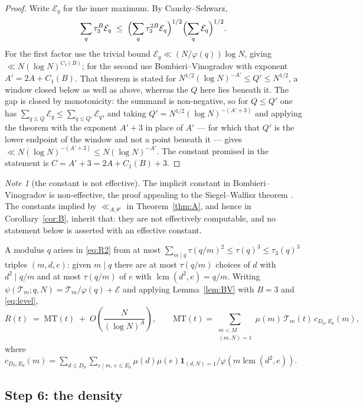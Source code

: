 \documentclass[11pt,a4paper]{article}
\theoremstyle{plain}
\theoremstyle{definition}
\theoremstyle{remark}
\newtheorem{note}[theorem]{Note}
\newcommand{\Tcut}{\mathcal T}
\DeclareMathOperator{\lcm}{lcm}
\begin{document}
\begin{proof}
Write $\mathcal E_q$ for the inner maximum. By Cauchy--Schwarz,
\[
  \sum_q\tau_3^B\mathcal E_q
  \;\le\;\Bigl(\sum_q\tau_3^{2B}\mathcal E_q\Bigr)^{1/2}
         \Bigl(\sum_q\mathcal E_q\Bigr)^{1/2}.
\]
For the first factor use the trivial bound
$\mathcal E_q\ll(N/\varphi(q))\log N$, giving $\ll N(\log N)^{C_1(B)}$;
for the second use Bombieri--Vinogradov \cite{MoV2} with exponent
$A'=2A+C_1(B)$. That theorem is stated for
$N^{1/2}(\log N)^{-A'}\le Q'\le N^{1/2}$, a window closed below as well
as above, whereas the $Q$ here lies beneath it. The gap is closed by
monotonicity: the summand is non-negative, so for $Q\le Q'$ one has
$\sum_{q\le Q}\mathcal E_q\le\sum_{q\le Q'}\mathcal E_q$, and taking
$Q'=N^{1/2}(\log N)^{-(A'+3)}$ and applying the theorem with the
exponent $A'+3$ in place of $A'$ --- for which that $Q'$ is the lower
endpoint of the window and not a point beneath it --- gives
$\ll N(\log N)^{-(A'+3)}\le N(\log N)^{-A'}$. The constant promised
in the statement is $C=A'+3=2A+C_1(B)+3$.
\end{proof}

\begin{note}[the constant is not effective]\label{note:noneffective}
The implicit constant in Bombieri--Vinogradov is non-effective, the
proof appealing to the Siegel--Walfisz theorem \cite{MoV2}. The
constants implied by $\ll_{A,\theta'}$ in Theorem~\ref{thm:A}, and
hence in Corollary~\ref{cor:B}, inherit that: they are not effectively
computable, and no statement below is asserted with an effective
constant.
\end{note}

A modulus $q$ arises in \eqref{eq:R2} from at most
$\sum_{m\mid q}\tau(q/m)^2\le\tau(q)^3\le\tau_3(q)^3$ triples
$(m,d,e)$: given $m\mid q$ there are at most $\tau(q/m)$ choices of
$d$ with $d^2\mid q/m$ and at most $\tau(q/m)$ of $e$ with
$\lcm(d^2,e)=q/m$. Writing $\psi(\Tcut_m;q,N)=\Tcut_m/\varphi(q)+\mathcal E$
and applying Lemma~\ref{lem:BV} with $B=3$ and \eqref{eq:level},
\begin{equation}\label{eq:R3}
  R(t)\;=\;\mathrm{MT}(t)\;+\;O\!\left(\frac{N}{(\log N)^{A}}\right),
  \qquad
  \mathrm{MT}(t)=\sum_{\substack{m<M\\ (m,N)=1}}
       \mu(m)\,\Tcut_m(t)\,c_{D_0,E_0}(m),
\end{equation}
where
$c_{D_0,E_0}(m)=\sum_{d\le D_0}\sum_{e\mid m,\,e\le E_0}
\mu(d)\mu(e)\mathbf 1_{(d,N)=1}/\varphi(m\lcm(d^2,e))$.

\subsection{Step 6: the density}
\end{document}
